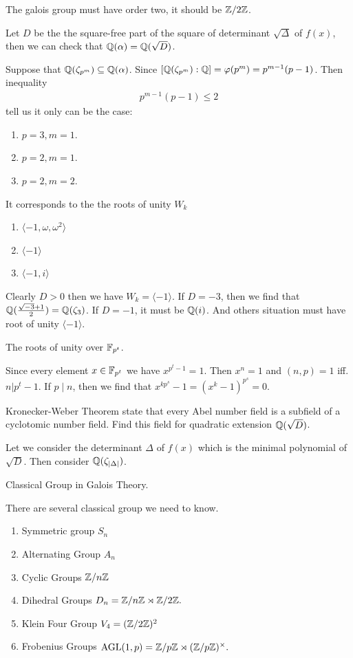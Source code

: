 {The galois group must have order two, it should be $\mathbb{Z}/2\mathbb{Z}$.

Let $D$ be the the square-free part of the square of determinant $\sqrt{\Delta}$ of $f(x)$, then we can check that $\mathbb{Q}(\alpha)=\mathbb{Q}(\sqrt{D})$.

Suppose that $\mathbb{Q}(\zeta_{p^m})\subseteq \mathbb{Q}(\alpha)$. Since $[\mathbb{Q}(\zeta_{p^m}):\mathbb{Q}] = \varphi(p^m) = p^{m-1}(p-1)$. Then inequality 
\begin{align*}
    p^{m-1}(p-1)\le 2
\end{align*}
tell us it only can be the case: 
\begin{enumerate}
    \item $p=3,m=1$.
    \item $p=2,m=1$.
    \item $p=2,m=2$.
\end{enumerate}
It corresponds to the the roots of unity $W_k$
\begin{enumerate}
    \item $\langle -1,\omega,\omega^2 \rangle$
    \item $\langle -1 \rangle$
    \item $\langle -1,i \rangle$
\end{enumerate}
Clearly $D>0$ then we have $W_k = \langle -1\rangle$. If $D=-3$, then we find that $\mathbb{Q}(\frac{\sqrt{-3}+1}{2})=\mathbb{Q}(\zeta_3)$. 
If $D=-1$, it must be $\mathbb{Q}(i)$. And others situation must have root of unity $\langle -1\rangle$.

\prob The roots of unity over $\mathbb{F}_{p^t}$. 

Since every element $x\in \mathbb{F}_{p^t}$ we have $x^{p^t-1}=1.$ Then $x^n=1$ and $(n,p)=1$ iff. $n|p^t-1$.
If $p\mid n$, then we find that $x^{kp^s}-1=(x^k-1)^{p^s}=0$.

\prob Kronecker-Weber Theorem state that every Abel number field is a subfield of a cyclotomic number field. Find this field for quadratic extension $\mathbb{Q}(\sqrt{D})$.

Let we consider the determinant $\Delta$ of $f(x)$ which is the minimal polynomial of $\sqrt{D}$.
Then consider $\mathbb{Q}(\zeta_{|\Delta|})$.



\prob Classical Group in Galois Theory.

There are several classical group we need to know.
\begin{enumerate}
    \item Symmetric group $S_n$
    \item Alternating Group $A_n$
    \item Cyclic Groups $\mathbb{Z}/n\mathbb{Z}$
    \item Dihedral Groups $D_n = \mathbb{Z}/n\mathbb{Z} \rtimes \mathbb{Z}/2\mathbb{Z}.$
    \item Klein Four Group $V_4 = (\mathbb{Z}/2\mathbb{Z})^2$
    \item Frobenius Groups $\text{AGL}(1,p)= \mathbb{Z}/p\mathbb{Z} \rtimes (\mathbb{Z}/p\mathbb{Z})^\times.$
\end{enumerate}



}
